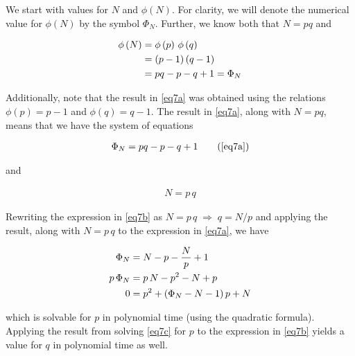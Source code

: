 \documentclass[../CryptoFinal.tex]{subfiles}
\begin{document}
\begin{flushleft}



  We start with values for $N$ and $\phi \left( N \right)$.  For clarity, we will denote the numerical value for $\phi \left( N \right)$ by the symbol $\Phi_N$.  Further, we know both that $N = p q$ and 

\begin{align}
  \phi \left( N \right) &= \phi \left( p \right) \, \phi \left( q \right) \notag \\
  &= \left( p - 1 \right) \left( q - 1 \right) \notag \\
  &= pq - p - q + 1 = \Phi_N \label{eq7a}
\end{align}

Additionally, note that the result in \ref{eq7a} was obtained using the relations $\phi \left( p \right) = p - 1$ and $\phi \left( q \right) = q - 1$.  The result in \ref{eq7a}, along with $N = p q$, means that we have the system of equations

\begin{align}
  \Phi_N = pq - p - q + 1 \tag{\ref{eq7a}}
\end{align}

and

\begin{align}
  N = p \, q \label{eq7b}
\end{align}

Rewriting the expression in \ref{eq7b} as $N = p \, q \; \Rightarrow \; q = N / p$ and applying the result, along with $N = p \, q$ to the expression in \ref{eq7a}, we have

\begin{align}
  \Phi_N &= N - p - \frac{N}{p} + 1 \notag \\
  p \, \Phi_N &= p \, N - p^2 - N + p \notag \\
  0 &= p^2 + \left( \Phi_N - N - 1 \right) p + N \label{eq7c}
\end{align}

which is solvable for $p$ in polynomial time (using the quadratic formula).  Applying the result from solving \ref{eq7c} for $p$ to the expression in \ref{eq7b} yields a value for $q$ in polynomial time as well.
























\end{flushleft}
\end{document}
